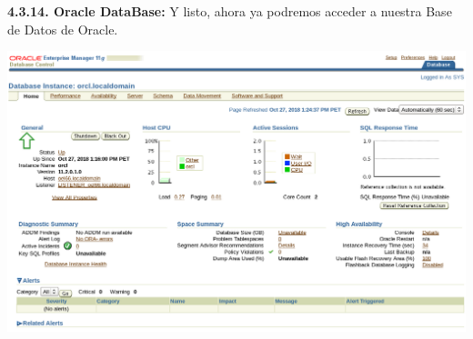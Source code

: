 \textbf {4.3.14. Oracle DataBase:} Y listo, ahora ya podremos acceder a nuestra Base de Datos de Oracle.
\begin{center}
  \includegraphics[width=15cm]{Imagenes/Oracle_Data_Base.png}
\end{center}
\break